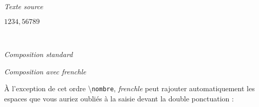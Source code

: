 \documentclass[a4paper,12pt,openright]{article}
\begin{document}
\begin{center} %
\textit{Texte source}\\[1ex]
\begin{boxedverbatim}
$1 234,567 89$
\end{boxedverbatim}
\\[.3ex]
\begin{minipage}{60mm}
\begin{center}
\textit{Composition standard}
\end{center}
\end{minipage}
\begin{minipage}{60mm}
\begin{center}
\textit{Composition avec frenchle}
\end{center}
\end{minipage}
\end{center}

\pagebreak
À l’exception de cet ordre  \backslash\texttt{nombre}, \textit{frenchle} peut rajouter automatiquement
les espaces que vous auriez oubliés à la saisie devant la double ponctuation :
\end{document}
